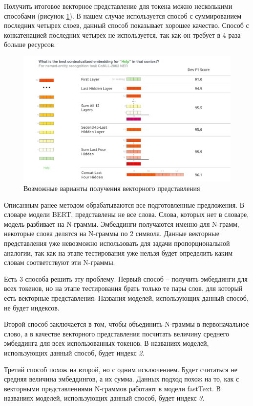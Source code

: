 \documentclass[a4paper,14pt]{article}
\begin{document}
Получить итоговое векторное представление для токена можно несколькими способами (рисунок \ref{fig:dif_vars_get_v}).
В нашем случае используется способ с суммированием последних четырех слоев, данный способ показывает хорошее качество.
Способ с конкатенацией последних четырех не используется, так как он требует в 4 раза больше ресурсов.

\begin{figure}[H]
	\centering
	\includegraphics[width=0.7\linewidth]{image/irvrsv9mefroz7io6ilnjng3fo4}
	\caption{Возможные варианты получения векторного представления}
	\label{fig:dif_vars_get_v}
\end{figure}

Описанным ранее методом обрабатываются все подготовленные предложения.
В словаре модели BERT, представлены не все слова.
Слова, которых нет в словаре, модель разбивает на N-граммы.
Эмбеддинги получаются именно для N-грамм, некоторые слова делятся на N-граммы по 2 символа.
Данные векторные представления уже невозможно использовать для задачи пропорциональной аналогии, так как на этапе тестирования уже нельзя будет определить каким словам соответствуют эти N-граммы.

Есть 3 способа решить эту проблему.
Первый способ -- получить эмбеддинги для всех токенов, но на этапе тестирования брать только те пары слов, для который есть векторные представления.
Названия моделей, использующих данный способ, не будет индексов.

Второй способ заключается в том, чтобы объединить N-граммы в первоначальное слово, а в качестве векторного представления посчитать величину среднего эмбеддинга для всех использованных токенов.
В названиях моделей, использующих данный способ, будет индекс \textit{2}.

Третий способ похож на второй, но с одним исключением.
Будет считаться не средняя величина эмбеддингов, а их сумма.
Данных подход похож на то, как с векторными представлениями N-граммов работают в модели fastText.
В названиях моделей, использующих данный способ, будет индекс \textit{3}.
\end{document}
